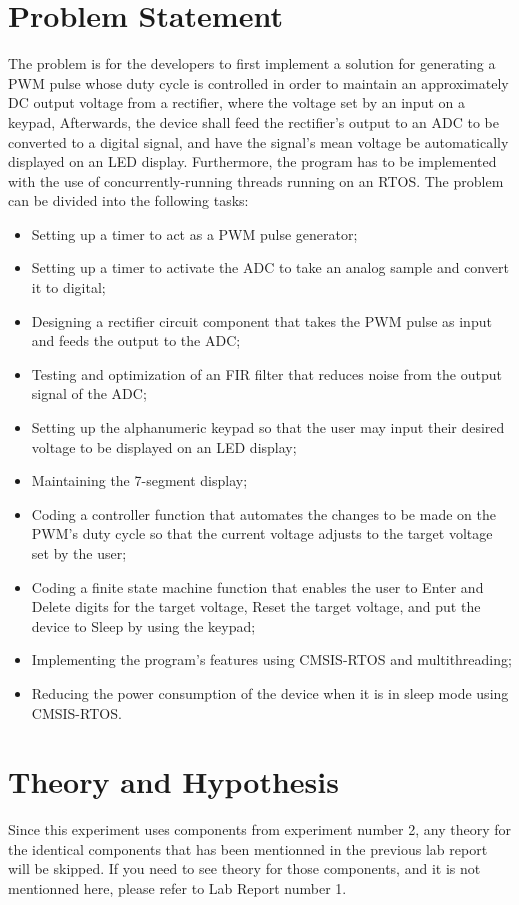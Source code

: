 \documentclass[12pt]{report}
\begin{document}
\section{Problem Statement}
The problem is for the developers to first implement a solution for generating a PWM pulse whose
duty cycle is controlled in order to maintain an approximately DC output voltage from a rectifier,
where the  voltage set by an input on a keypad,  Afterwards, the device
shall feed the rectifier's output to an ADC to be converted to a digital signal, and have the
signal's mean voltage be automatically displayed on an LED display. Furthermore, the program has to
be implemented with the use of concurrently-running threads running on an RTOS. The problem can be
divided into the following tasks:
\begin{itemize}
	\item Setting up a timer to act as a PWM pulse generator;
	\item Setting up a timer to activate the ADC to take an analog sample and convert it to digital;
	\item Designing a rectifier circuit component that takes the PWM pulse as input and feeds the output to the ADC;
	\item Testing and optimization of an FIR filter that reduces noise from the output signal of the ADC;
	\item Setting up the alphanumeric keypad so that the user may input their desired voltage to be displayed on an LED display;
	\item Maintaining the 7-segment display;
	\item Coding a controller function that automates the changes to be made on the PWM's duty cycle
		so that the current voltage adjusts to the target voltage set by the user;
	\item Coding a finite state machine function that enables the user to Enter and Delete digits for the target voltage, Reset the target voltage, and put the device to Sleep by using the keypad;
	\item Implementing the program's features using CMSIS-RTOS and multithreading;
	\item Reducing the power consumption of the device when it is in sleep mode using CMSIS-RTOS.
\end{itemize}
\section{Theory and Hypothesis}
Since this experiment uses components from experiment number 2, any theory for the identical components that has been mentionned in the previous lab report will be skipped. If you need to see theory for those components, and it is not mentionned here, please refer to Lab Report number 1.
\end{document}
